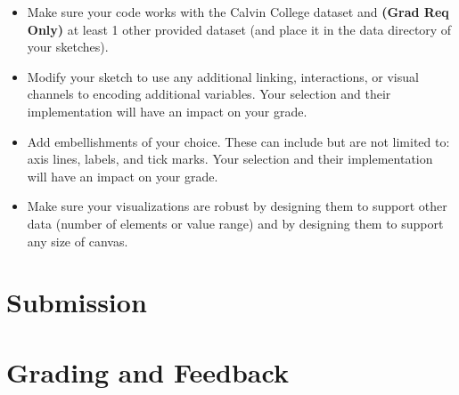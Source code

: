 \documentclass[a4paper,12pt]{article}
\begin{document}
\begin{itemize}
\item Make sure your code works with the Calvin College dataset and \textbf{(Grad Req Only)} at least 1 other provided dataset (and place it in the data directory of your sketches).

\item Modify your sketch to use any additional linking, interactions, or visual channels to encoding additional variables. Your selection and their implementation will have an impact on your grade.

\item Add embellishments of your choice. These can include but are not limited to: axis lines, labels, and tick marks. Your selection and their implementation will have an impact on your grade.

\item Make sure your visualizations are robust by designing them to support other data (number of elements or value range) and by designing them to support any size of canvas.

\end{itemize}


\section{Submission}


\section{Grading and Feedback}

\end{document}
